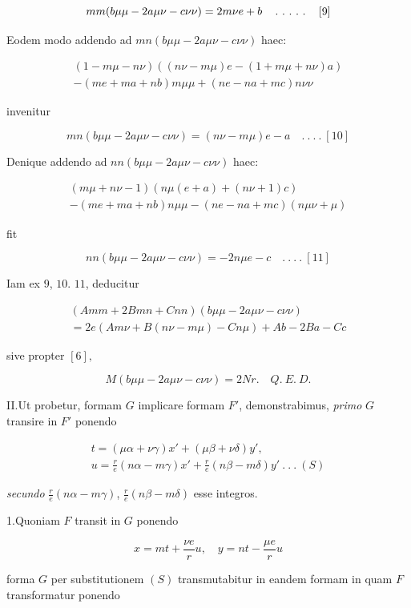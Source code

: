 \[
mm(b\mu\mu-2a\mu\nu-c\nu\nu)=2m\nu e+b\quad\mathinner{.\ .\ .\ .\ .}\quad[9]
\]

Eodem modo addendo ad $mn(b\mu\mu-2a\mu\nu-c\nu\nu)$ haec:


\[
\begin{gathered}(1-m\mu-n\nu)((n\nu-m\mu)e-(1+m\mu+n\nu)a)\\-(me+ma+nb)m\mu\mu+(ne-na+mc)n\nu\nu\end{gathered}
\]

invenitur

\[
mn(b\mu\mu-2a\mu\nu-c\nu\nu)=(n\nu-m\mu)e-a\quad .\ .\ .\ .\ [10]
\]

Denique addendo ad $nn(b\mu\mu-2a\mu\nu-c\nu\nu)$ haec:

\[
\begin{gathered}(m\mu+n\nu-1)(n\mu(e+a)+(n\nu+1)c)\\-(me+ma+nb)n\mu\mu-(ne-na+mc)(n\mu\nu+\mu)\end{gathered}
\]

fit

\[
nn(b\mu\mu-2a\mu\nu-c\nu\nu)=-2n\mu e-c\quad .\ .\ .\ .\ [11]
\]

Iam ex $9$, $10$. $11$, deducitur

\[
\begin{gathered}(Amm+2Bmn+Cnn)(b\mu\mu-2a\mu\nu-c\nu\nu)\\=2e(Am\nu+B(n\nu-m\mu)-Cn\mu)+Ab-2Ba-Cc\end{gathered}
\]

sive propter $[6],$

\[
M(b\mu\mu-2a\mu\nu-c\nu\nu)=2Nr.\quad Q.\ E.\ D.
\]

II.\quad Ut probetur, formam $G$ implicare formam $F'$, demonstrabimus, \emph{primo} $G$ transire in $F'$ ponendo

\[
\begin{gathered}t=(\mu\alpha+\nu\gamma)x'+(\mu\beta+\nu\delta)y',\\u=\frac re(n\alpha-m\gamma)x'+\frac re(n\beta-m\delta)y'\ .\ .\ .\ (S)\end{gathered}
\]

\emph{secundo} $\frac{r}{e}(n\alpha-m\gamma)$, $\frac{r}{e}(n\beta-m\delta)$ esse integros.

1.\quad Quoniam $F$ transit in $G$ ponendo

\[
x=mt+\frac{\nu e}{r}u,\quad y=nt-\frac{\mu e}{r}u
\]

forma $G$ per substitutionem $(S)$ transmutabitur in eandem formam in quam $F$ transformatur ponendo

